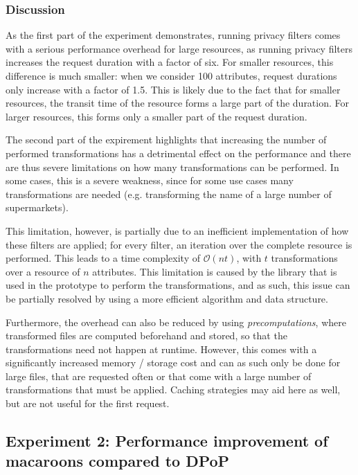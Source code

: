 \newpage





\subsubsection{Discussion}
As the first part of the experiment demonstrates, running privacy filters comes with a serious performance overhead for large resources, as running privacy filters increases the request duration with a factor of six. For smaller resources, this difference is much smaller: when we consider 100 attributes, request durations only increase with a factor of 1.5. This is likely due to the fact that for smaller resources, the transit time of the resource forms a large part of the duration. For larger resources, this forms only a smaller part of the request duration.

The second part of the expirement highlights that increasing the number of performed transformations has a detrimental effect on the performance and there are thus severe limitations on how many transformations can be performed. In some cases, this is a severe weakness, since for some use cases many transformations are needed (e.g. transforming the name of a large number of supermarkets).

This limitation, however, is partially due to an inefficient implementation of how these filters are applied; for every filter, an iteration over the complete resource is performed. This leads to a time complexity of $\mathcal{O}(nt)$, with $t$ transformations over a resource of $n$ attributes. This limitation is caused by the library that is used in the prototype to perform the transformations, and as such, this issue can be partially resolved by using a more efficient algorithm and data structure.

Furthermore, the overhead can also be reduced by using \textit{precomputations}, where transformed files are computed beforehand and stored, so that the transformations need not happen at runtime. However, this comes with a significantly increased memory / storage cost and can as such only be done for large files, that are requested often or that come with a large number of transformations that must be applied. Caching strategies may aid here as well, but are not useful for the first request. 


\newpage
\subsection{Experiment 2: Performance improvement of macaroons compared to DPoP}
\label{sec:macaroons-performance}
